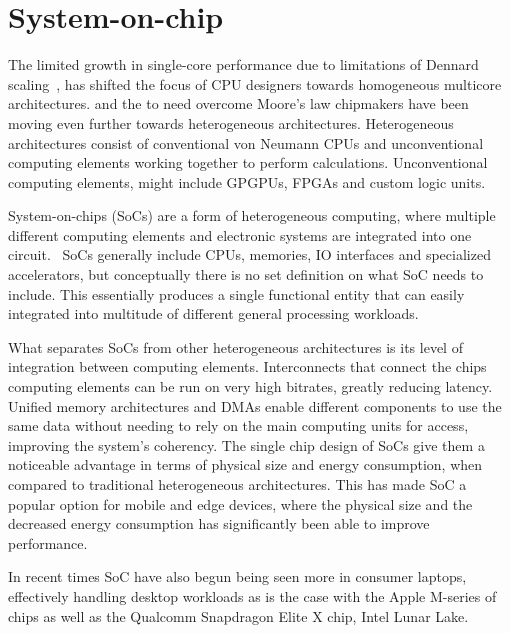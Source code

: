 \documentclass[12pt,a4paper,english
]{tunithesis}
\begin{document}
\section{System-on-chip}
The limited growth in single-core performance due to limitations of Dennard scaling~\cite{esmaeilzadeh_dark_2011}, has shifted the focus of CPU designers towards homogeneous multicore architectures.
and the to need overcome Moore's law chipmakers have been moving even further towards heterogeneous architectures. Heterogeneous architectures consist of conventional von Neumann CPUs and unconventional computing elements working together to perform calculations. Unconventional computing elements, might include GPGPUs, FPGAs and custom logic units.~\cite{chung_single-chip_2010}

System-on-chips (SoCs) are a form of heterogeneous computing, where multiple different computing elements and electronic systems are integrated into one circuit.~\cite{Greaves2021}
SoCs generally include CPUs, memories, IO interfaces and specialized accelerators, but conceptually there is no set definition on what SoC needs to include.
This essentially produces a single functional entity that can easily integrated into multitude of different general processing workloads.

What separates SoCs from other heterogeneous architectures is its level of integration between computing elements. Interconnects that connect the chips computing elements can be run on very high bitrates, greatly reducing latency. Unified memory architectures and DMAs enable different components to use the same data without needing to rely on the main computing units for access, improving the system's coherency. The single chip design of SoCs give them a noticeable advantage in terms of physical size and energy consumption, when compared to traditional heterogeneous architectures. This has made SoC a popular option for mobile and edge devices, where the physical size and the decreased energy consumption has significantly been able to improve performance.

In recent times SoC have also begun being seen more in consumer laptops, effectively handling desktop workloads as is the case with the Apple M-series of chips as well as the Qualcomm Snapdragon Elite X chip, Intel Lunar Lake.

\cite{di_natale_moving_2010}
\end{document}
